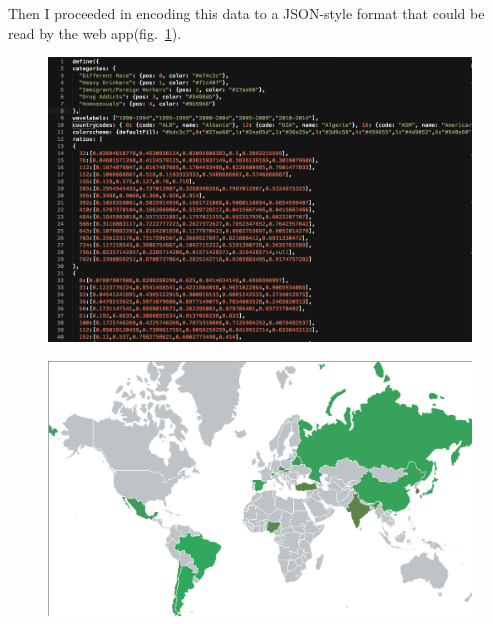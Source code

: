 \documentclass[a4paper,12pt,twoside]{article}
\begin{document}
Then I proceeded in encoding this data to a JSON-style format that could be read by the web app(fig.~\ref{json}).
\begin{figure}[H]
\centering
{
\includegraphics[width=12cm,angle=0]{json2.png}
}
\caption{\label{json}}
\end{figure}
\begin{figure}[h]
\centering
{
\includegraphics[width=12cm,angle=0]{map1.png}
}
\caption{\label{map1}}
\end{figure}
\end{document}
